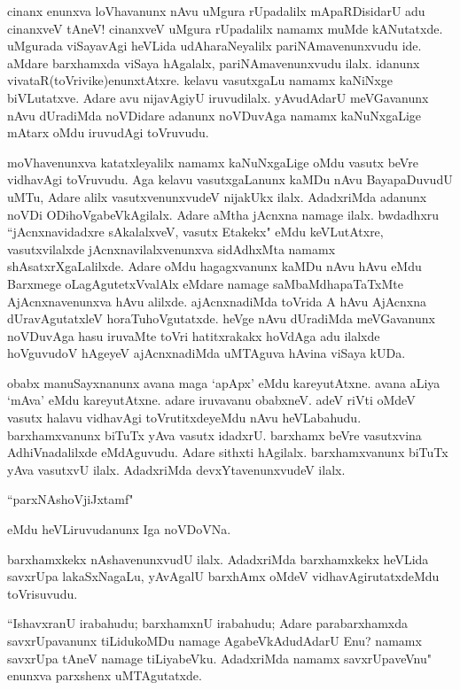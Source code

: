 cinanx enunxva loVhavanunx nAvu uMgura rUpadalilx mApaRDisidarU adu cinanxveV tAneV! cinanxveV uMgura rUpadalilx namamx muMde kANutatxde. uMgurada viSayavAgi heVLida udAharaNeyalilx pariNAmavenunxvudu ide. aMdare barxhamxda viSaya hAgalalx, pariNAmavenunxvudu ilalx. idanunx vivataR(toVrivike)enunxtAtxre. kelavu vasutxgaLu namamx kaNiNxge biVLutatxve. Adare avu nijavAgiyU iruvudilalx. yAvudAdarU meVGavanunx nAvu dUradiMda noVDidare adanunx noVDuvAga namamx kaNuNxgaLige mAtarx oMdu iruvudAgi toVruvudu.

moVhavenunxva katatxleyalilx namamx kaNuNxgaLige oMdu vasutx beVre vidhavAgi toVruvudu. Aga kelavu vasutxgaLanunx kaMDu nAvu BayapaDuvudU uMTu, Adare alilx vasutxvenunxvudeV nijakUkx ilalx. AdadxriMda adanunx noVDi ODihoVgabeVkAgilalx. Adare aMtha jAcnxna namage ilalx. bwdadhxru ``jAcnxnavidadxre sAkalalxveV, vasutx Etakekx" eMdu keVLutAtxre, vasutxvilalxde jAcnxnavilalxvenunxva sidAdhxMta namamx shAsatxrXgaLalilxde. Adare oMdu hagagxvanunx kaMDu nAvu hAvu eMdu Barxmege oLagAgutetxVvalAlx eMdare namage saMbaMdhapaTaTxMte AjAcnxnavenunxva hAvu alilxde. ajAcnxnadiMda toVrida A hAvu AjAcnxna dUravAgutatxleV horaTuhoVgutatxde. heVge nAvu dUradiMda meVGavanunx noVDuvAga hasu iruvaMte toVri hatitxrakakx hoVdAga adu ilalxde hoVguvudoV hAgeyeV ajAcnxnadiMda uMTAguva hAvina viSaya kUDa. 


obabx manuSayxnanunx avana maga `apApx' eMdu kareyutAtxne. avana aLiya `mAva' eMdu kareyutAtxne. adare iruvavanu obabxneV. adeV riVti oMdeV vasutx halavu vidhavAgi toVrutitxdeyeMdu nAvu heVLabahudu. barxhamxvanunx biTuTx yAva vasutx idadxrU. barxhamx beVre vasutxvina AdhiVnadalilxde eMdAguvudu. Adare sithxti hAgilalx. barxhamxvanunx biTuTx yAva vasutxvU ilalx. AdadxriMda devxYtavenunxvudeV ilalx. 

\begin{shloka}
``parxNAshoVjiJxtamf"
\end{shloka}

eMdu heVLiruvudanunx Iga noVDoVNa.

barxhamxkekx nAshavenunxvudU ilalx. AdadxriMda barxhamxkekx heVLida savxrUpa lakaSxNagaLu, yAvAgalU barxhAmx oMdeV vidhavAgirutatxdeMdu toVrisuvudu. 

``IshavxranU irabahudu; barxhamxnU irabahudu; Adare parabarxhamxda savxrUpavanunx tiLidukoMDu namage AgabeVkAdudAdarU Enu? namamx savxrUpa tAneV namage tiLiyabeVku. AdadxriMda namamx savxrUpaveVnu" enunxva parxshenx uMTAgutatxde. 

